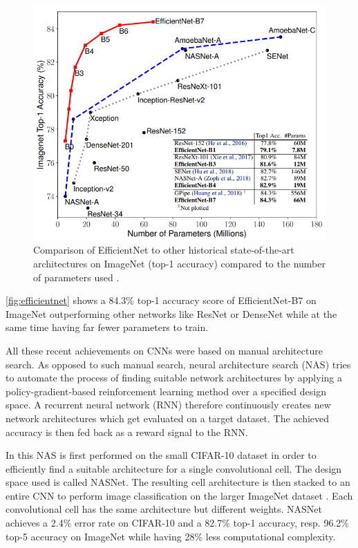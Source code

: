 \begin{figure}[t]
	\begin{center}
		\includegraphics[width=\linewidth]{images/efficientnet.PNG}
	\end{center}
	\caption{Comparison of EfficientNet to other historical state-of-the-art architectures on ImageNet (top-1 accuracy) compared to the number of parameters used \cite{LeMingxingTan.2019}.}
	\label{fig:efficientnet}
\end{figure}

\autoref{fig:efficientnet} shows a 84.3\% top-1 accuracy score of EfficientNet-B7 on ImageNet \cite{JiaDeng.2009} outperforming other networks like ResNet or DenseNet while at the same time having far fewer parameters to train. \cite{LeMingxingTan.2019}

All these recent achievements on CNNs were based on manual architecture search. As opposed to such manual search, neural architecture search (NAS) tries to automate the process of finding suitable network architectures by applying a policy-gradient-based reinforcement learning method over a specified design space. A recurrent neural network (RNN) therefore continuously creates new network architectures which get evaluated on a target dataset. The achieved accuracy is then fed back as a reward signal to the RNN. \cite{LeBarretZoph.2017}

In \cite{BarretZoph.2018} this NAS is first performed on the small CIFAR-10 dataset \cite{AlexKrizhevsky.2009} in order to efficiently find a suitable architecture for a single convolutional cell. The design space used is called NASNet. The resulting cell architecture is then stacked to an entire CNN to perform image classification on the larger ImageNet dataset \cite{JiaDeng.2009}. Each convolutional cell has the same architecture but different weights. NASNet achieves a 2.4\% error rate on CIFAR-10 \cite{AlexKrizhevsky.2009} and a 82.7\% top-1 accuracy, resp. 96.2\% top-5 accuracy on ImageNet \cite{JiaDeng.2009} while having 28\% less computational complexity. 

